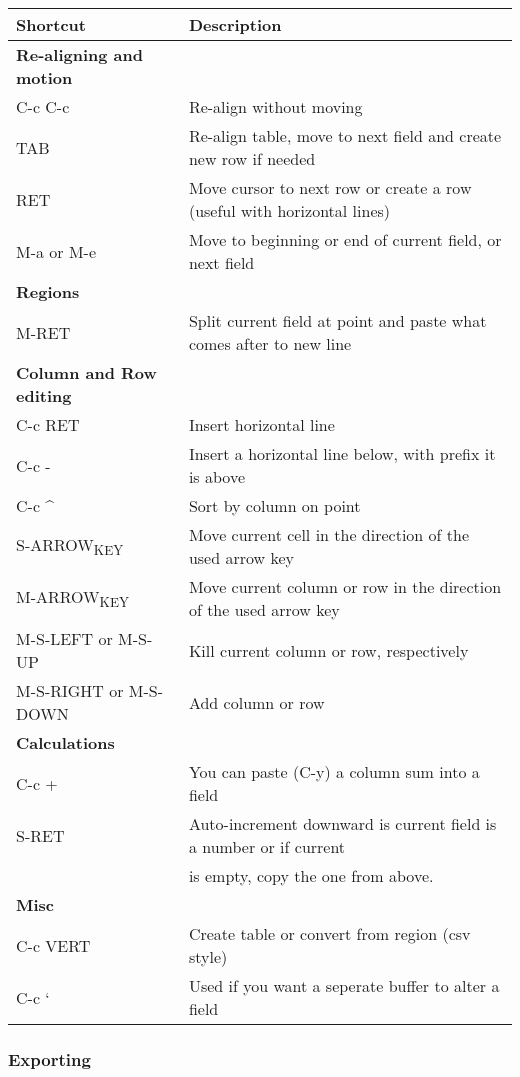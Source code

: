 \documentclass[11pt]{article}
\begin{document}
\begin{center}
\begin{tabular}{ll}
\hline
Shortcut & Description\\
\hline
\textbf{Re-aligning and motion} & \\
\hline
C-c C-c & Re-align without moving\\
TAB & Re-align table, move to next field and create new row if needed\\
RET & Move cursor to next row or create a row (useful with horizontal lines)\\
M-a or M-e & Move to beginning or end of current field, or next field\\
\hline
\textbf{Regions} & \\
\hline
M-RET & Split current field at point and paste what comes after to new line\\
\hline
\textbf{Column and Row editing} & \\
\hline
C-c RET & Insert horizontal line\\
C-c - & Insert a horizontal line below, with prefix it is above\\
C-c \^{} & Sort by column on point\\
S-ARROW\textsubscript{KEY} & Move current cell in the direction of the used arrow key\\
M-ARROW\textsubscript{KEY} & Move current column or row in the direction of the used arrow key\\
M-S-LEFT or M-S-UP & Kill current column or row, respectively\\
M-S-RIGHT or M-S-DOWN & Add column or row\\
\hline
\textbf{Calculations} & \\
\hline
C-c + & You can paste (C-y) a column sum into a field\\
S-RET & Auto-increment downward is current field is a number or if current\\
 & is empty, copy the one from above.\\
\hline
\textbf{Misc} & \\
\hline
C-c VERT & Create table or convert from region (csv style)\\
C-c ` & Used if you want a seperate buffer to alter a field\\
\hline
\end{tabular}
\end{center}
\subsubsection{Exporting}
\label{sec:org17abea9}
\end{document}
